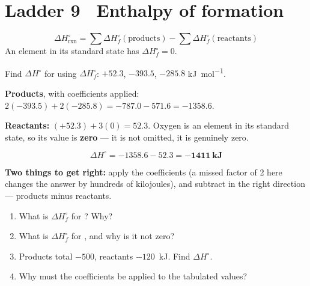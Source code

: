\documentclass{apchem-worksheet}
\begin{document}
\section*{\sffamily Ladder 9 \textbullet\ Enthalpy of formation}

\[ \Delta H^\circ_{\text{rxn}} = \sum \Delta H_f^\circ(\text{products})
   - \sum \Delta H_f^\circ(\text{reactants}) \]
An element in its standard state has $\Delta H_f^\circ = 0$.

\begin{workedexample}
Find $\Delta H^\circ$ for
 using
$\Delta H_f^\circ$:  $+52.3$,  $-393.5$,
 $-285.8$ \si{\kilo\joule\per\mole}.

\textbf{Products}, with coefficients applied:
$2(-393.5) + 2(-285.8) = -787.0 - 571.6 = \num{-1358.6}$.

\textbf{Reactants:} $(+52.3) + 3(0) = \num{52.3}$. Oxygen is an element in
its standard state, so its value is \textbf{zero} --- it is not omitted, it
is genuinely zero.

\[ \Delta H^\circ = -1358.6 - 52.3 = \mathbf{-1411~kJ} \]

\textbf{Two things to get right:} apply the coefficients (a missed factor
of 2 here changes the answer by hundreds of kilojoules), and subtract in
the right direction --- products minus reactants.
\end{workedexample}

\begin{yourturn}
\begin{enumerate}[leftmargin=*,itemsep=0.5em]
  \item What is $\Delta H_f^\circ$ for ? Why?
        \workspace[1.6cm]
  \item What is $\Delta H_f^\circ$ for , and why is it not
        zero? \workspace[1.8cm]
  \item Products total $-500$, reactants $-120$~kJ. Find
        $\Delta H^\circ$. \workspace[1.4cm]
  \item Why must the coefficients be applied to the tabulated values?
        \workspace[1.8cm]
\end{enumerate}
\end{yourturn}
\end{document}
